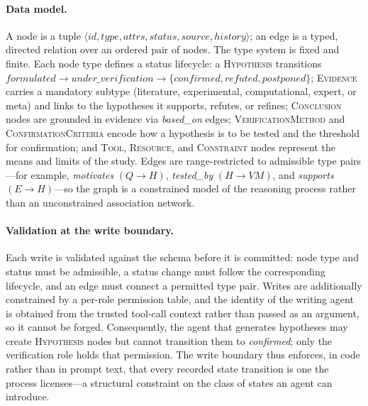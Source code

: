 \paragraph{Data model.}
A node is a tuple $\langle \mathit{id}, \mathit{type}, \mathit{attrs},
\mathit{status}, \mathit{source}, \mathit{history} \rangle$; an edge is a typed,
directed relation over an ordered pair of nodes. The type system is fixed and
finite. Each node type defines a status lifecycle: a \textsc{Hypothesis}
transitions
$\mathit{formulated} \rightarrow \mathit{under\_verification} \rightarrow
\{\mathit{confirmed}, \mathit{refuted}, \mathit{postponed}\}$; \textsc{Evidence}
carries a mandatory subtype (literature, experimental, computational, expert, or
meta) and links to the hypotheses it supports, refutes, or refines;
\textsc{Conclusion} nodes are grounded in evidence via \emph{based\_on} edges;
\textsc{VerificationMethod} and \textsc{ConfirmationCriteria} encode how a
hypothesis is to be tested and the threshold for confirmation; and \textsc{Tool},
\textsc{Resource}, and \textsc{Constraint} nodes represent the means and limits of
the study. Edges are range-restricted to admissible type pairs---for example,
\emph{motivates} $(Q \rightarrow H)$, \emph{tested\_by} $(H \rightarrow VM)$, and
\emph{supports} $(E \rightarrow H)$---so the graph is a constrained model of the
reasoning process rather than an unconstrained association network.

\paragraph{Validation at the write boundary.}
Each write is validated against the schema before it is committed: node type and
status must be admissible, a status change must follow the corresponding
lifecycle, and an edge must connect a permitted type pair. Writes are additionally
constrained by a per-role permission table, and the identity of the writing agent
is obtained from the trusted tool-call context rather than passed as an argument,
so it cannot be forged. Consequently, the agent that generates hypotheses may
create \textsc{Hypothesis} nodes but cannot transition them to
\emph{confirmed}; only the verification role holds that permission. The write
boundary thus enforces, in code rather than in prompt text, that every recorded
state transition is one the process licenses---a structural constraint on the
class of states an agent can introduce.

